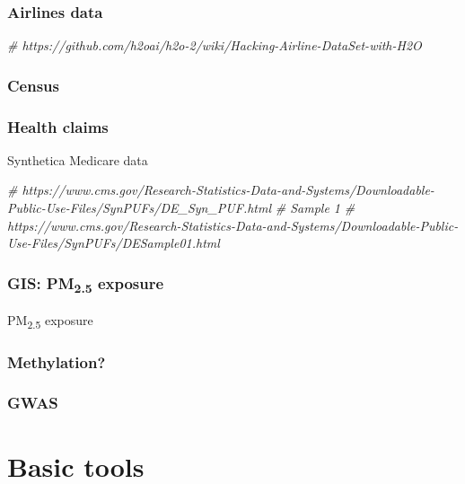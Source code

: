\documentclass[]{book}
\newenvironment{Shaded}{\begin{snugshade}}{\end{snugshade}}
\newcommand{\CommentTok}[1]{\textcolor[rgb]{0.56,0.35,0.01}{\textit{{#1}}}}
\theoremstyle{definition}
\theoremstyle{definition}
\theoremstyle{definition}
\theoremstyle{remark}
\begin{document}
\subsection{Airlines data}\label{airlines-data}

\begin{Shaded}
\begin{Highlighting}[]
\CommentTok{# https://github.com/h2oai/h2o-2/wiki/Hacking-Airline-DataSet-with-H2O}
\end{Highlighting}
\end{Shaded}

\subsection{Census}\label{census}

\subsection{Health claims}\label{health-claims}

Synthetica Medicare data

\begin{Shaded}
\begin{Highlighting}[]
\CommentTok{# https://www.cms.gov/Research-Statistics-Data-and-Systems/Downloadable-Public-Use-Files/SynPUFs/DE_Syn_PUF.html}
\CommentTok{# Sample 1}
\CommentTok{# https://www.cms.gov/Research-Statistics-Data-and-Systems/Downloadable-Public-Use-Files/SynPUFs/DESample01.html}
\end{Highlighting}
\end{Shaded}

\subsection{\texorpdfstring{GIS: PM\textsubscript{2.5}
exposure}{GIS: PM2.5 exposure}}\label{gis-pm2.5-exposure}

PM\textsubscript{2.5} exposure

\subsection{Methylation?}\label{methylation}

\subsection{GWAS}\label{gwas}

\chapter{Basic tools}\label{basics}
\end{document}
